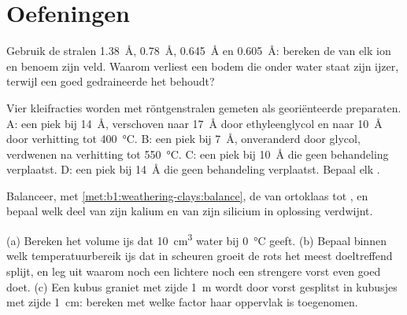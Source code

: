 \section{Oefeningen}

\begin{exercise}[$\star$]\label{exo:b1:weathering-clays:1}
Gebruik de stralen  \qty{1.38}{\angstrom},  \qty{0.78}{\angstrom},  \qty{0.645}{\angstrom} en  \qty{0.605}{\angstrom}: bereken de  van elk ion en benoem zijn veld. Waarom verliest een bodem die onder water staat zijn ijzer, terwijl een goed gedraineerde het behoudt?
\end{exercise}

\begin{exercise}[$\star$]\label{exo:b1:weathering-clays:2}
Vier kleifracties worden met röntgenstralen gemeten als georiënteerde preparaten. A: een piek bij \SI{14}{\angstrom}, verschoven naar \SI{17}{\angstrom} door ethyleenglycol en naar \SI{10}{\angstrom} door verhitting tot \SI{400}{\celsius}. B: een piek bij \SI{7}{\angstrom}, onveranderd door glycol, verdwenen na verhitting tot \SI{550}{\celsius}. C: een piek bij \SI{10}{\angstrom} die geen behandeling verplaatst. D: een piek bij \SI{14}{\angstrom} die geen behandeling verplaatst. Bepaal elk .
\end{exercise}

\begin{exercise}[$\star$]\label{exo:b1:weathering-clays:3}
Balanceer, met \cref{met:b1:weathering-clays:balance}, de  van ortoklaas  tot , en bepaal welk deel van zijn kalium en van zijn silicium in oplossing verdwijnt.
\end{exercise}

\begin{exercise}[$\star$]\label{exo:b1:weathering-clays:4}
(a) Bereken het volume ijs dat \qty{10}{cm^3} water bij \qty{0}{\celsius} geeft. (b) Bepaal binnen welk temperatuurbereik ijs dat in scheuren groeit de rots het meest doeltreffend splijt, en leg uit waarom noch een lichtere noch een strengere vorst even goed doet. (c) Een kubus graniet met zijde \qty{1}{m} wordt door vorst gesplitst in kubusjes met zijde \qty{1}{cm}: bereken met welke factor haar oppervlak is toegenomen.
\end{exercise}


